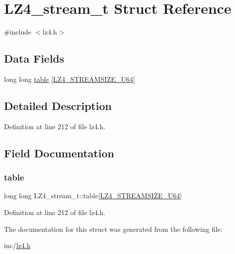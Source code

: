 \hypertarget{structLZ4__stream__t}{}\section{L\+Z4\+\_\+stream\+\_\+t Struct Reference}
\label{structLZ4__stream__t}


{\ttfamily \#include $<$lz4.\+h$>$}

\subsection*{Data Fields}
\begin{DoxyCompactItemize}
\item 
long long \mbox{\hyperlink{structLZ4__stream__t_ace4521180b0858afb67f9681394b14b4}{table}} \mbox{[}\mbox{\hyperlink{lz4_8h_acddbce79f3e1d413f295e97d986ab3f5}{L\+Z4\+\_\+\+S\+T\+R\+E\+A\+M\+S\+I\+Z\+E\+\_\+\+U64}}\mbox{]}
\end{DoxyCompactItemize}


\subsection{Detailed Description}


Definition at line 212 of file lz4.\+h.



\subsection{Field Documentation}
\mbox{\label{structLZ4__stream__t_ace4521180b0858afb67f9681394b14b4}} 
\subsubsection{\texorpdfstring{table}{table}}
{\footnotesize\ttfamily long long L\+Z4\+\_\+stream\+\_\+t\+::table\mbox{[}\mbox{\hyperlink{lz4_8h_acddbce79f3e1d413f295e97d986ab3f5}{L\+Z4\+\_\+\+S\+T\+R\+E\+A\+M\+S\+I\+Z\+E\+\_\+\+U64}}\mbox{]}}



Definition at line 212 of file lz4.\+h.



The documentation for this struct was generated from the following file\+:\begin{DoxyCompactItemize}
\item 
inc/\mbox{\hyperlink{lz4_8h}{lz4.\+h}}\end{DoxyCompactItemize}
